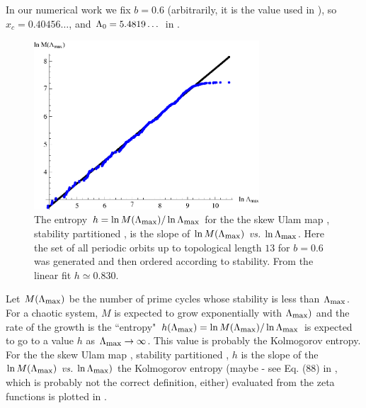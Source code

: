 In our numerical work we fix  $b=0.6$ (arbitrarily,
it is the value used in ), so
$x_c =0.40456\dots$, and $\Lambda_0 = 5.4819\dots$ in
.

\begin{figure}
\begin{center}
	\includegraphics[width=0.75\textwidth]{figs/skewUlamEntropy}
\end{center}
\caption[Stability cutoff for skew Ulam map.]{
    {\small
The entropy $h = \ln M(\Lambda_{\mbox{\footnotesize max}})/\ln\Lambda_{\mbox{\footnotesize max}}$ for the
the skew Ulam map , stability partitioned \statesp,
is the slope of $\ln M(\Lambda_{\mbox{\footnotesize max}})$ {\em vs.}  $\ln \Lambda_{\mbox{\footnotesize max}}$.
Here the set of all periodic orbits up to topological length $13$ for $b=0.6$
was generated and then ordered according to stability. From the linear
fit $h\simeq 0.830$.
        }}
\label{fig:logStabOrder1}
\end{figure}

Let $M(\Lambda_{\mbox{\footnotesize max}})$
be the number of prime cycles whose stability is less than $\Lambda_{\mbox{\footnotesize max}}$.
For a chaotic system, $M$ is expected to grow exponentially with $ \Lambda_{\mbox{\footnotesize max}})$ and
the rate of the growth is the
``entropy" $h (\Lambda_{\mbox{\footnotesize max}}) = \ln M(\Lambda_{\mbox{\footnotesize max}})/\ln\Lambda_{\mbox{\footnotesize max}}$
is expected to go to a value $h$ as $\Lambda_{\mbox{\footnotesize max}} \to \infty$.
This value is probably the Kolmogorov entropy.
For the
the skew Ulam map , stability
partitioned \statesp,
$h$ is the slope of
the $\ln M(\Lambda_{\mbox{\footnotesize max}})$ {\em vs.}
$\ln \Lambda_{\mbox{\footnotesize max}})$
the Kolmogorov entropy (maybe - see Eq. (88) in , which
is probably not the correct definition, either) evaluated from
the zeta functions  is plotted in .

